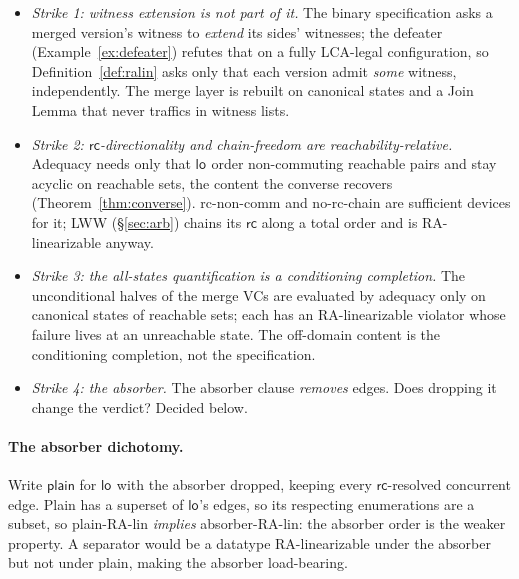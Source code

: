 \documentclass[11pt]{article}
\newcommand{\rcrel}{\mathsf{rc}}                 %
\newcommand{\loE}[1]{\mathsf{lo}^{#1}}
\begin{document}
\begin{itemize}[leftmargin=1.4em]
\item \emph{Strike 1: witness extension is not part of it.} The binary
  specification asks a merged version's witness to \emph{extend} its sides'
  witnesses; the defeater (Example~\ref{ex:defeater}) refutes that on a
  fully LCA-legal configuration, so Definition~\ref{def:ralin} asks only
  that each version admit \emph{some} witness, independently. The merge
  layer is rebuilt on canonical states and a Join Lemma that never traffics
  in witness lists.
\item \emph{Strike 2: $\rcrel$-directionality and chain-freedom are
  reachability-relative.} Adequacy needs only that $\loE{}$ order
  non-commuting reachable pairs and stay acyclic on reachable sets, the
  content the converse recovers (Theorem~\ref{thm:converse}). rc-non-comm
  and no-rc-chain are sufficient devices for it; LWW (\S\ref{sec:arb})
  chains its $\rcrel$ along a total order and is RA-linearizable anyway.
\item \emph{Strike 3: the all-states quantification is a conditioning
  completion.} The unconditional halves of the merge VCs are evaluated by
  adequacy only on canonical states of reachable sets; each has an
  RA-linearizable violator whose failure lives at an unreachable state. The
  off-domain content is the conditioning completion, not the
  specification.
\item \emph{Strike 4: the absorber.} The absorber clause \emph{removes}
  edges. Does dropping it change the verdict? Decided below.
\end{itemize}

\paragraph{The absorber dichotomy.} Write $\mathsf{plain}$ for $\loE{}$
with the absorber dropped, keeping every $\rcrel$-resolved concurrent edge.
Plain has a superset of $\loE{}$'s edges, so its respecting enumerations
are a subset, so plain-RA-lin \emph{implies} absorber-RA-lin: the absorber
order is the weaker property. A separator would be a datatype
RA-linearizable under the absorber but not under plain, making the absorber
load-bearing.
\end{document}
